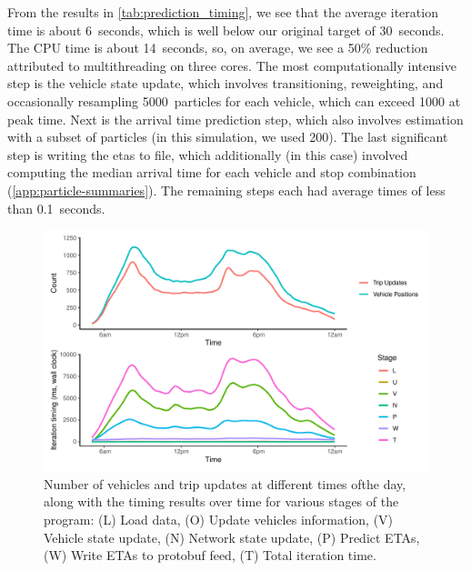 From the results in \cref{tab:prediction_timing}, we see that the average iteration time is about 6~seconds, which is well below our original target of 30~seconds. The CPU time is about 14~seconds, so, on average, we see a 50\% reduction attributed to multithreading on three cores. The most computationally intensive step is the vehicle state update, which involves transitioning, reweighting, and occasionally resampling 5000~particles for each vehicle, which can exceed 1000 at peak time. Next is the arrival time prediction step, which also involves estimation with a subset of particles (in this simulation, we used 200). The last significant step is writing the \glspl{eta} to file, which additionally (in this case) involved computing the median arrival time for each vehicle and stop combination (\cref{app:particle-summaries}). The remaining steps each had average times of less than 0.1~seconds.



\begin{knitrout}\small
{}\color{fgcolor}\begin{figure}

{\centering \includegraphics[width=\textwidth]{figure/prediction_timing_time-1} 

}

\caption[Number of vehicles and trip updates at different times ofthe day, along with the timing results over time for various stages of the program]{Number of vehicles and trip updates at different times ofthe day, along with the timing results over time for various stages of the program: (L) Load data, (O) Update vehicles information, (V) Vehicle state update, (N) Network state update, (P) Predict ETAs, (W) Write ETAs to protobuf feed, (T) Total iteration time.}\label{fig:prediction_timing_time}
\end{figure}


\end{knitrout}




